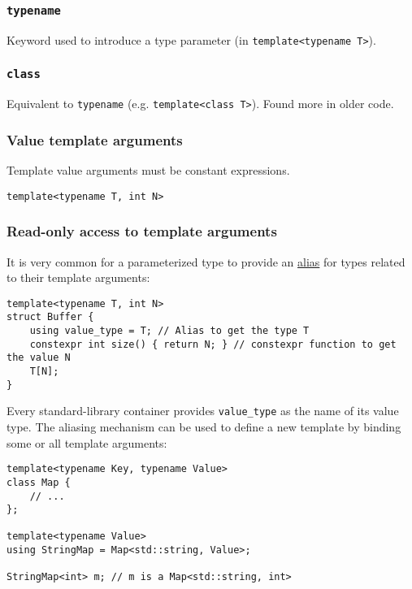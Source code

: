 \documentclass[8pt, table, xcdraw]{article}%
\begin{document}
\subsubsection{\lstinline{typename}}

Keyword used to introduce a type parameter (in \lstinline{template<typename T>}).

\subsubsection{\lstinline{class}}

Equivalent to \lstinline{typename} (e.g. \lstinline{template<class T>}). Found more in older code.

\subsubsection{Value template arguments}

Template value arguments must be constant expressions.

\begin{lstlisting}
template<typename T, int N>
\end{lstlisting}

\subsubsection{Read-only access to template arguments} \label{readonlyaccesstotemplatearguments}

It is very common for a parameterized type to provide an \hyperref[alias]{alias} for types related to their template arguments:

\begin{lstlisting}
template<typename T, int N>
struct Buffer {
    using value_type = T; // Alias to get the type T
    constexpr int size() { return N; } // constexpr function to get the value N
    T[N];
}
\end{lstlisting}

Every standard-library container provides \lstinline{value_type} as the name of its value type. The aliasing mechanism can be used to define a new template by binding some or all template arguments:

\begin{lstlisting}
template<typename Key, typename Value>
class Map {
    // ...
};

template<typename Value>
using StringMap = Map<std::string, Value>;

StringMap<int> m; // m is a Map<std::string, int>
\end{lstlisting}
\end{document}
